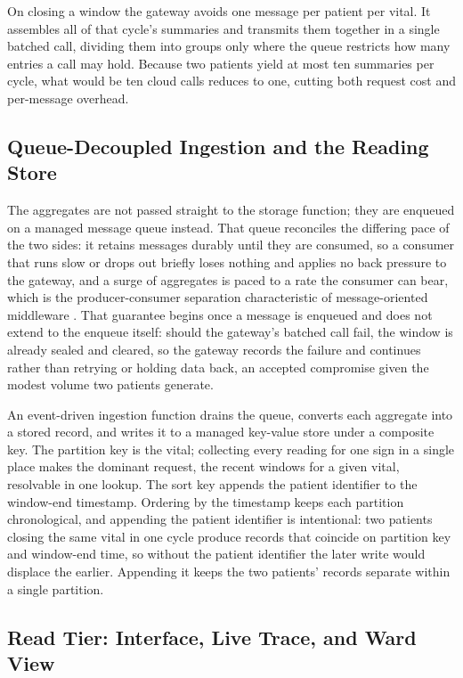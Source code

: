 \documentclass[conference]{IEEEtran}
\begin{document}
On closing a window the gateway avoids one message per patient per vital. It assembles all of that cycle's summaries and transmits them together in a single batched call, dividing them into groups only where the queue restricts how many entries a call may hold. Because two patients yield at most ten summaries per cycle, what would be ten cloud calls reduces to one, cutting both request cost and per-message overhead.

\subsection{Queue-Decoupled Ingestion and the Reading Store}

The aggregates are not passed straight to the storage function; they are enqueued on a managed message queue instead. That queue reconciles the differing pace of the two sides: it retains messages durably until they are consumed, so a consumer that runs slow or drops out briefly loses nothing and applies no back pressure to the gateway, and a surge of aggregates is paced to a rate the consumer can bear, which is the producer-consumer separation characteristic of message-oriented middleware \cite{hohpe2003}. That guarantee begins once a message is enqueued and does not extend to the enqueue itself: should the gateway's batched call fail, the window is already sealed and cleared, so the gateway records the failure and continues rather than retrying or holding data back, an accepted compromise given the modest volume two patients generate.

An event-driven ingestion function drains the queue, converts each aggregate into a stored record, and writes it to a managed key-value store under a composite key. The partition key is the vital; collecting every reading for one sign in a single place makes the dominant request, the recent windows for a given vital, resolvable in one lookup. The sort key appends the patient identifier to the window-end timestamp. Ordering by the timestamp keeps each partition chronological, and appending the patient identifier is intentional: two patients closing the same vital in one cycle produce records that coincide on partition key and window-end time, so without the patient identifier the later write would displace the earlier. Appending it keeps the two patients' records separate within a single partition.

\subsection{Read Tier: Interface, Live Trace, and Ward View}
\end{document}
